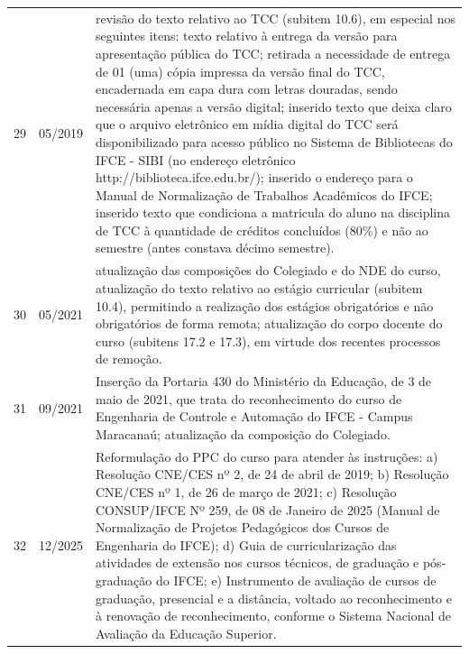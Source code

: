 \begin{center}
\begin{longtable}{lp{2cm}p{11cm}}
		29 & 05/2019 & revisão do texto relativo ao TCC (subitem 10.6), em especial nos seguintes itens: texto relativo à entrega da versão para apresentação pública do TCC; retirada a necessidade de entrega de 01 (uma) cópia impressa da versão final do TCC, encadernada em capa dura com letras douradas, sendo necessária apenas a versão digital; inserido texto que deixa claro que o arquivo eletrônico em mídia digital do TCC será disponibilizado para acesso público no Sistema de Bibliotecas do IFCE - SIBI (no endereço eletrônico http://biblioteca.ifce.edu.br/); inserido o endereço para o Manual de Normalização de Trabalhos Acadêmicos do IFCE; inserido texto que condiciona a matricula do aluno na disciplina de TCC à quantidade de créditos concluídos (80\%) e não ao semestre (antes constava décimo semestre).
		\\
		30 & 05/2021 & atualização das composições do Colegiado e do NDE do curso, atualização do texto relativo ao estágio curricular (subitem 10.4), permitindo a realização dos estágios obrigatórios e não obrigatórios de forma remota; atualização do corpo docente do curso (subitens 17.2 e 17.3), em virtude dos recentes processos de remoção.
		\\
		31 & 09/2021 & Inserção da Portaria 430 do Ministério da Educação, de 3 de maio de 2021, que trata do reconhecimento do curso de Engenharia de Controle e Automação do IFCE - Campus Maracanaú; atualização da composição do Colegiado.
		\\
		32 & 12/2025 & Reformulação do PPC do curso para atender às instruções: a) Resolução CNE/CES nº 2, de 24 de abril de 2019;
		b) Resolução CNE/CES nº 1, de 26 de março de 2021; c) Resolução CONSUP/IFCE Nº 259, de 08 de Janeiro de 2025 (Manual de Normalização de Projetos Pedagógicos dos Cursos de Engenharia do IFCE); d) Guia de curricularização das atividades de extensão nos cursos técnicos, de graduação e pós-graduação do IFCE; e) Instrumento de avaliação de cursos de graduação, presencial e a distância, voltado ao reconhecimento e à renovação de reconhecimento, conforme o Sistema Nacional de Avaliação da Educação Superior.

	\end{longtable}
\end{center}
